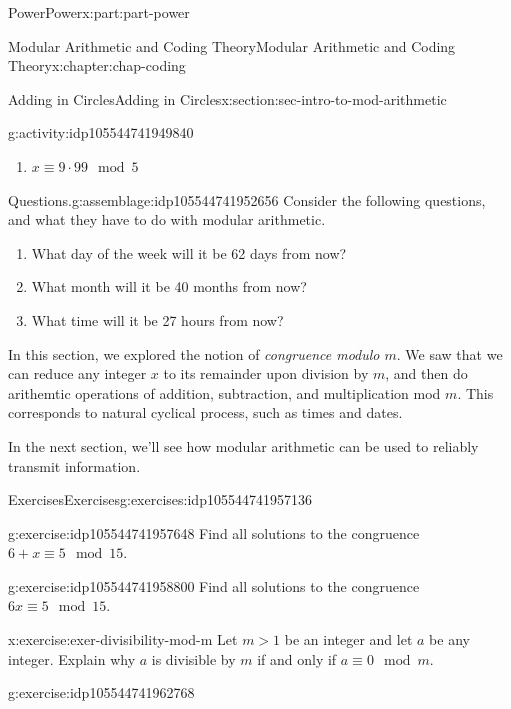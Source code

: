 \documentclass[oneside,10pt,]{book}
\numberwithin{equation}{section}
\newcommand{\gt}{>}
\begin{document}
\begin{partptx}{Power}{}{Power}{}{}{x:part:part-power}
\begin{chapterptx}{Modular Arithmetic and Coding Theory}{}{Modular Arithmetic and Coding Theory}{}{}{x:chapter:chap-coding}
\begin{sectionptx}{Adding in Circles}{}{Adding in Circles}{}{}{x:section:sec-intro-to-mod-arithmetic}
\begin{activity}{}{g:activity:idp105544741949840}
\begin{enumerate}
\item{}\(\displaystyle x \equiv 9\cdot 99\mod 5\)%
\end{enumerate}
\end{activity}%
\begin{assemblage}{Questions.}{g:assemblage:idp105544741952656}%
Consider the following questions, and what they have to do with modular arithmetic. %
\begin{enumerate}
\item{}What day of the week will it be 62 days from now?%
\item{}What month will it be 40 months from now?%
\item{}What time will it be 27 hours from now?%
\end{enumerate}
%
\end{assemblage}
\begin{conclusion}{}%
In this section, we explored the notion of \emph{congruence modulo \(m\)}. We saw that we can reduce any integer \(x\) to its remainder upon division by \(m\), and then do arithemtic operations of addition, subtraction, and multiplication mod \(m\). This corresponds to natural cyclical process, such as times and dates.%
\par
In the next section, we'll see how modular arithmetic can be used to reliably transmit information.%
\end{conclusion}%
%
%
\typeout{************************************************}
\typeout{************************************************}
%
\begin{exercises-subsection-numberless}{Exercises}{}{Exercises}{}{}{g:exercises:idp105544741957136}
\begin{divisionexercise}{1}{}{}{g:exercise:idp105544741957648}%
Find all solutions to the congruence \(6 + x \equiv 5\mod 15\).%
\end{divisionexercise}%
\begin{divisionexercise}{2}{}{}{g:exercise:idp105544741958800}%
Find all solutions to the congruence \(6x \equiv 5\mod 15\).%
\end{divisionexercise}%
\begin{divisionexercise}{3}{}{}{x:exercise:exer-divisibility-mod-m}%
Let \(m\gt 1\) be an integer and let \(a\) be any integer. Explain why \(a\) is divisible by \(m\) if and only if \(a\equiv 0\mod m\).%
\end{divisionexercise}%
\begin{divisionexercise}{4}{}{}{g:exercise:idp105544741962768}%

\end{divisionexercise}
\end{exercises-subsection-numberless}
\end{sectionptx}
\end{chapterptx}
\end{partptx}
\end{document}
